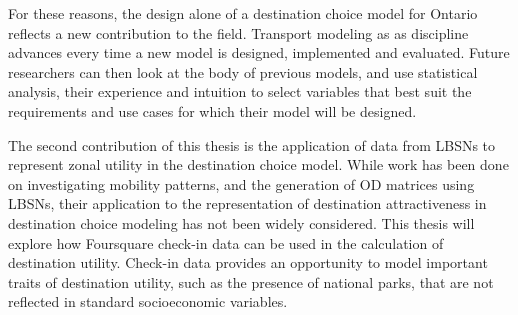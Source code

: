 For these reasons, the design alone of a destination choice model for Ontario reflects a new contribution to the field.  Transport modeling as as discipline advances every time a new model is designed, implemented and evaluated. Future researchers can then look at the body of previous models, and use statistical analysis, their experience and intuition to select variables that best suit the requirements and use cases for which their model will be designed. 

The second contribution of this thesis is the application of data from LBSNs to represent zonal utility in the destination choice model. While work has been done on investigating mobility patterns, and the generation of OD matrices using LBSNs, their application to the representation of destination attractiveness in destination choice modeling has not been widely considered. This thesis will explore how Foursquare check-in data can be used in the calculation of destination utility. Check-in data provides an opportunity to model important traits of destination utility, such as the presence of national parks, that are not reflected in standard socioeconomic variables.

